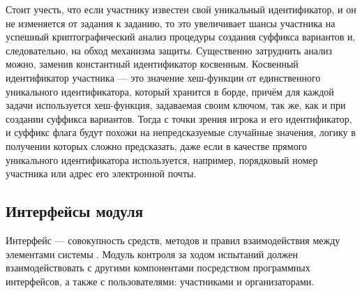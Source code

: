 Стоит учесть, что если участнику известен свой уникальный идентификатор, и он не изменяется от задания к заданию, то это увеличивает шансы участника на успешный криптографический анализ процедуры создания суффикса вариантов и, следовательно, на обход механизма защиты. Существенно затруднить анализ можно, заменив константный идентификатор косвенным. Косвенный идентификатор участника — это значение хеш-функции от единственного уникального идентификатора, который хранится в борде, причём для каждой задачи используется хеш-функция, задаваемая своим ключом, так же, как и при создании суффикса вариантов. Тогда с точки зрения игрока и его идентификатор, и суффикс флага будут похожи на непредсказуемые случайные значения, логику в получении которых сложно предсказать, даже если в качестве прямого уникального идентификатора используется, например, порядковый номер участника или адрес его электронной почты.



\subsection{Интерфейсы модуля}

Интерфейс — совокупность средств, методов и правил взаимодействия между элементами системы \cite{Nostroi}. Модуль контроля за ходом испытаний должен взаимодействовать с другими компонентами посредством программных интерфейсов, а также с пользователями: участниками и организаторами.


